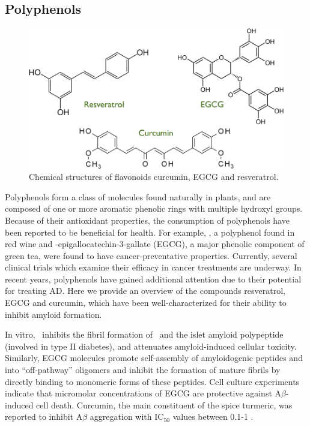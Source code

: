 \subsection{Polyphenols}
\begin{figure}
\centering
\includegraphics[width=5.5in]{figures/introduction/polyphenols.pdf}
\caption[Polyphenol molecules]{Chemical structures of flavonoids curcumin, EGCG and resveratrol.}
\label{fig:polyphenols}
\end{figure}

Polyphenols form a class of molecules found naturally in plants, and are composed of one or more aromatic phenolic rings with multiple hydroxyl groups.  Because of their antioxidant properties, the consumption of polyphenols have been reported to be beneficial for health.  For example, \resve, a polyphenol found in red wine and  -epigallocatechin-3-gallate (EGCG), a major phenolic component of green tea, were found to have cancer-preventative properties.\cite{Baur:2006bx,Singh:2011ec} Currently, several clinical trials which examine their efficacy in cancer treatments are underway.\cite{Baur:2006bx,Singh:2011ec} In recent years, polyphenols have gained additional attention due to their potential for treating AD.\cite{Porat:2006fn} Here we provide an overview of the compounds resveratrol, EGCG and curcumin, which have been well-characterized for their ability to inhibit amyloid formation.

In vitro, \resve\ inhibits the fibril formation of \abeta\ and the islet amyloid polypeptide (involved in type II diabetes), and attenuates amyloid-induced cellular toxicity.\cite{Ono:2008bl,Feng:2009p2240} Similarly, EGCG molecules promote self-assembly of amyloidogenic peptides \abeta\cite{Ehrnhoefer:2008fd} and \alphas\cite{Bieschke:2010ju} into ``off-pathway'' oligomers and inhibit the formation of mature fibrils by directly binding to monomeric forms of these peptides. Cell culture experiments indicate that micromolar concentrations of EGCG are protective against A$\beta$-induced cell death.\cite{Levites:2003wm,Bastianetto:2006du} Curcumin, the main constituent of the spice turmeric, was reported to inhibit A$\beta$ aggregation with IC$_{50}$ values between 0.1-1 \micromolar.\cite{Singh:2012df,Ono:2004td,Hamaguchi:2009p2874,Kim:2005wk} 


